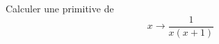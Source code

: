 Calculer une primitive de 
\begin{displaymath}
 x \rightarrow \frac{1}{x(x+1)}
\end{displaymath}
\bigskip \bigskip